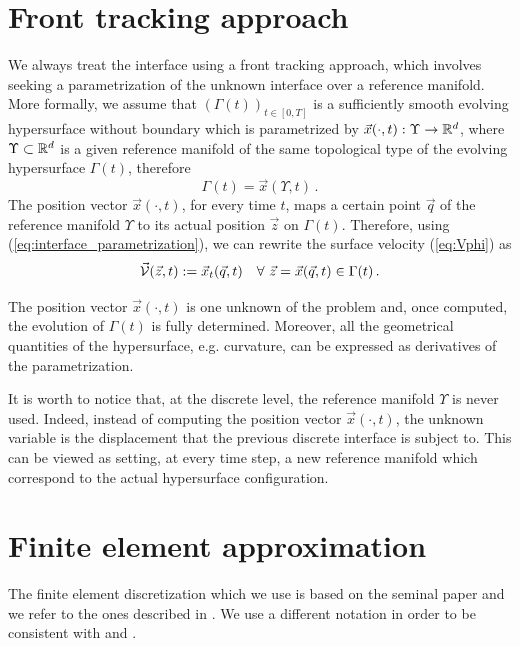 \section{Front tracking approach}\label{sec:front_tracking_approach}
We always treat the interface using a front tracking approach, which involves
seeking a parametrization of the unknown interface over a reference manifold.
More formally, we assume that $(\Gamma(t))_{t\in [0,T]}$ is a sufficiently
smooth evolving hypersurface without boundary which is parametrized by
$\vec x(\cdot,t):\Upsilon\to\mathbb R^d$, where $\Upsilon\subset \mathbb R^d$ is a given
reference manifold of the same topological type of the evolving hypersurface
$\Gamma(t)$, therefore
\begin{equation}\label{eq:interface_parametrization}
\Gamma(t) = \vec x(\Upsilon,t)\,.
\end{equation}
The position vector $\vec x(\cdot,t)$, for every time $t$, maps a certain point
$\vec q$ of the reference manifold $\Upsilon$ to its actual position
$\vec z$ on $\Gamma(t)$. Therefore, using (\ref{eq:interface_parametrization}),
we can rewrite the surface velocity (\ref{eq:Vphi}) as
\begin{equation} \label{eq:V}
\vec{\mathcal{V}}(\vec z, t) := \vec x_t(\vec q, t) \quad
\forall\ \vec z = \vec x(\vec q,t) \in \Gamma(t)\,.
\end{equation}

The position vector $\vec x(\cdot,t)$ is one unknown of the problem and, once
computed, the evolution of $\Gamma(t)$ is fully determined. Moreover, all the
geometrical quantities of the hypersurface, e.g. curvature, can be expressed as
derivatives of the parametrization.

It is worth to notice that, at the discrete level, the reference manifold
$\Upsilon$ is never used. Indeed, instead of computing the position vector
$\vec x(\cdot,t)$, the unknown variable is the displacement that the previous
discrete interface is subject to. This can be viewed as setting, at every time
step, a new reference manifold which correspond to the actual hypersurface
configuration.

\section{Finite element approximation}\label{sec:geometric_pdes_fem}
The finite element discretization which we use is based on the seminal paper
\cite{Dziuk91} and we refer to the ones described in
\cite{triplejMC,triplej,gflows3d}. We use a different notation in order to be
consistent with \cite{spurious} and \cite{stokesfitted}.

